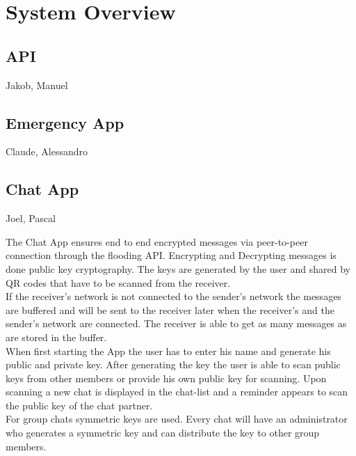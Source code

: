 \documentclass{report}
\newcommand{\rfig}[1]{Figure~\ref{fig:#1}}
\begin{document}
	\section{System Overview}
		\subsection{API}
		Jakob, Manuel
		
		\subsection{Emergency App}
		Claude, Alessandro
		
		\subsection{Chat App}
		Joel, Pascal
			
			The Chat App ensures end to end encrypted messages via peer-to-peer connection through the flooding API. Encrypting and Decrypting messages is done public key cryptography. The keys are generated by the user and shared by QR codes that have to be scanned from the receiver.\\
			If the receiver's network is not connected to the sender's network the messages are buffered and will be sent to the receiver later when the receiver's and the sender's network are connected. The receiver is able to get as many messages as are stored in the buffer.\\
			
			When first starting the App the user has to enter his name and generate his public and private key. After generating the key the user is able to scan public keys from other members or provide his own public key for scanning. Upon scanning a new chat is displayed in the chat-list and a reminder appears to scan the public key of the chat partner. \\
			
			For group chats symmetric keys are used. Every chat will have an administrator who generates a symmetric key and can distribute the key to other group members.\\
			
\end{document}
